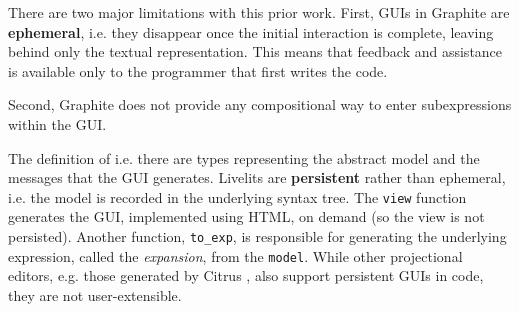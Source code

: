 \documentclass[nonacm]{acmart}
\newcommand{\li}[1]{\lstinline[basicstyle=\ttfamily\fontsize{9pt}{1em}\selectfont]{#1}}
\theoremstyle{slplain}
\numberwithin{thm}{section}
\begin{document}
There are two major limitations with this prior work. 
First, GUIs in Graphite are \textbf{ephemeral}, i.e. they disappear once the initial interaction is complete, leaving behind only the textual representation. This means that feedback and assistance is available only to the programmer
that first writes the code. 

Second, Graphite does not provide any compositional way to {enter subexpressions within the GUI}.





The definition of
i.e. there are types representing the abstract model and the messages that the 
GUI generates. Livelits are \textbf{persistent} rather than ephemeral, i.e. the model is recorded in the underlying syntax tree. The \li{view} function generates the GUI, implemented using HTML, on demand (so the view is not persisted). Another function, \li{to_exp}, is responsible for generating the underlying expression, called the \emph{expansion}, from the \li{model}. 
While other projectional editors, e.g. those generated by Citrus \cite{DBLP:conf/uist/KoM05}, also support persistent GUIs in code, they are not user-extensible. 
\end{document}
